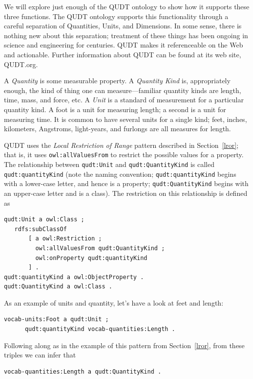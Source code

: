 We will explore just enough of the QUDT ontology to show how it supports
these three functions. The QUDT ontology supports this functionality
through a careful separation of Quantities, Units, and Dimensions. In
some sense, there is nothing new about this separation; treatment of
these things has been ongoing in science and engineering for centuries.
QUDT makes it referenceable on the Web and actionable. Further
information about QUDT can be found at its web site, QUDT.org.

A \emph{Quantity} is some measurable property. A \emph{Quantity Kind} is,
appropriately enough, the kind of thing one can measure---familiar
quantity kinds are length, time, mass, and force, etc. A \emph{Unit} is a
standard of measurement for a particular quantity kind. A foot is a unit
for measuring length; a second is a unit for measuring time. It is
common to have several units for a single kind; feet, inches,
kilometers, Angstroms, light-years, and furlongs are all measures for
length.

QUDT uses the \emph{Local Restriction of Range} pattern described in Section~\ref{lror}; that is, it uses
\texttt{owl:allValuesFrom} to restrict the possible values for a property. The
relationship between \texttt{qudt:Unit} and \texttt{qudt:QuantityKind} is called
\texttt{qudt:quantityKind} (note the naming convention; \texttt{qudt:quantityKind} begins
with a lower-case letter, and hence is a property; \texttt{qudt:QuantityKind}
begins with an upper-case letter and is a class). The restriction on
this relationship is defined as

\begin{lstlisting}
qudt:Unit a owl:Class ;
   rdfs:subClassOf
       [ a owl:Restriction ;
         owl:allValuesFrom qudt:QuantityKind ;
         owl:onProperty qudt:quantityKind
       ] .
qudt:quantityKind a owl:ObjectProperty .
qudt:QuantityKind a owl:Class .
\end{lstlisting}


As an example of units and quantity, let's have a look at feet and
length:

\begin{lstlisting}
vocab-units:Foot a qudt:Unit ;
      qudt:quantityKind vocab-quantities:Length .
\end{lstlisting}

Following along as in the example of this pattern from Section~\ref{lror}, from
these triples we can infer that

\begin{lstlisting}
vocab-quantities:Length a qudt:QuantityKind .
\end{lstlisting}

